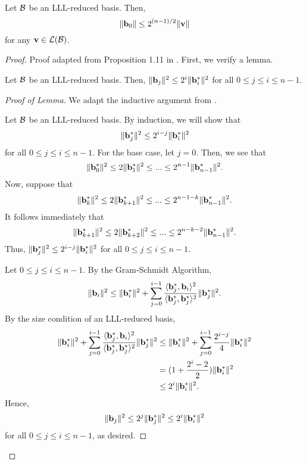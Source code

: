 \documentclass[a4paper,12pt]{article}
\begin{document}
\begin{thm}
Let $\mathcal{B}$ be an LLL-reduced basis. Then, $$\|\mathbf{b}_0\| \leq 2^{(n-1)/2}\|\mathbf{v}\|$$ for any $\mathbf{v} \in \mathcal{L}(\mathcal{B})$.
\end{thm}

\begin{proof}
Proof adapted from Proposition 1.11 in \cite{LLL}. First, we verify a lemma.

\begin{lem}
Let $\mathcal{B}$ be an LLL-reduced basis. Then, $\|\mathbf{b}_{j}\|^2 \leq 2^{i}\|\mathbf{b}_{i}^{*}\|^2$ for all $0 \leq j\leq i\leq n-1$.
\end{lem}

\begin{proof}[Proof of Lemma]
    We adapt the inductive argument from \cite{LLL}.
    
    Let $\mathcal{B}$ be an LLL-reduced basis. By induction, we will show that $$\|\mathbf{b}_{j}^*\|^{2} \leq 2^{i-j}\|\mathbf{b}_{i}^{*}\|^2$$ for all $0\leq j\leq i\leq n-1$. For the base case, let $j=0$. Then, we see that $$\|\mathbf{b}_{0}^{*}\|^2 \leq 2\|\mathbf{b}_{1}^{*}\|^2 \leq ... \leq 2^{n-1}\|\mathbf{b}_{n-1}^{*}\|^2.$$ Now, suppose that $$\|\mathbf{b}_{k}^{*}\|^2 \leq 2\|\mathbf{b}_{k+1}^{*}\|^2 \leq ... \leq 2^{n-1-k}\|\mathbf{b}_{n-1}^{*}\|^2.$$ It follows immediately that $$\|\mathbf{b}_{k+1}^{*}\|^2 \leq 2\|\mathbf{b}_{k+2}^{*}\|^2 \leq ... \leq 2^{n-k-2}\|\mathbf{b}_{n-1}^{*}\|^2.$$ Thus, $\|\mathbf{b}_{j}^*\|^{2} \leq 2^{i-j}\|\mathbf{b}_{i}^{*}\|^2$ for all $0\leq j\leq i\leq n-1$.
    
    Let $0\leq j\leq i\leq n-1$. By the Gram-Schmidt Algorithm, $$\|\mathbf{b}_{i}\|^{2} \leq \|\mathbf{b}_{i}^{*}\|^{2} + \sum_{j=0}^{i-1}\frac{\langle\mathbf{b}_{j}^{*},\mathbf{b}_{i}\rangle^2}{\langle\mathbf{b}_{j}^{*},\mathbf{b}_{j}^{*}\rangle^2}\|\mathbf{b}_{j}^{*}\|^{2}.$$ By the size condition of an LLL-reduced basis, 
    \begin{align*}
        \|\mathbf{b}_{i}^{*}\|^{2} + \sum_{j=0}^{i-1}\frac{\langle\mathbf{b}_{j}^{*},\mathbf{b}_{i}\rangle^2}{\langle\mathbf{b}_{j}^{*},\mathbf{b}_{j}^{*}\rangle^2}\|\mathbf{b}_{j}^{*}\|^{2} &\leq \|\mathbf{b}_{i}^{*}\|^{2} +  \sum_{j=0}^{i-1}\frac{2^{i-j}}{4}\|\mathbf{b}_{i}^{*}\|^{2} \\
        &= (1+\frac{2^{i}-2}{2})\|\mathbf{b}_{i}^{*}\|^{2} \\
        &\leq 2^{i}\|\mathbf{b}_{i}^{*}\|^{2}.
    \end{align*}
    Hence, $$\|\mathbf{b}_{j}\|^{2} \leq 2^{j}\|\mathbf{b}_{j}^{*}\|^{2} \leq 2^{i}\|\mathbf{b}_{i}^{*}\|^{2}$$ for all $0\leq j\leq i\leq n-1$, as desired.
\end{proof}


\end{proof}
\end{document}
